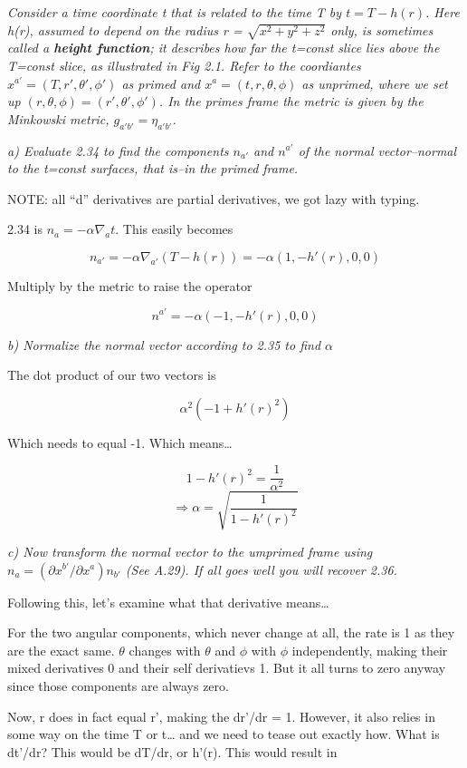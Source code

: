 \documentclass[landscape,letterpaper,10pt,english]{article}
\begin{document}
\[\label{P3}\]

\emph{Consider a time coordinate t that is related to the time T by
\(t = T-h(r)\). Here h(r), assumed to depend on the radius r =
\(\sqrt{x^2+y^2+z^2}\) only, is sometimes called a \textbf{height
function}; it describes how far the t=const slice lies above the T=const
slice, as illustrated in Fig 2.1. Refer to the coordiantes
\(x^{a'}=(T,r',\theta',\phi')\) as primed and
\(x^{a}=(t,r,\theta,\phi)\) as unprimed, where we set up
\((r,\theta,\phi)=(r',\theta ', \phi ')\). In the primes frame the
metric is given by the Minkowski metric, \(g_{a'b'} = \eta_{a'b'}\).}

\emph{a) Evaluate 2.34 to find the components \(n_{a'}\) and \(n^{a'}\)
of the normal vector--normal to the t=const surfaces, that is--in the
primed frame.}

    NOTE: all ``d'' derivatives are partial derivatives, we got lazy with
typing.

2.34 is \(n_a = -\alpha \nabla_a t\). This easily becomes

\[ n_{a'} = -\alpha \nabla_{a'} (T-h(r)) = -\alpha(1,-h'(r),0,0)\]

Multiply by the metric to raise the operator

\[ n^{a'} = -\alpha(-1,-h'(r),0,0)\]

    \emph{b) Normalize the normal vector according to 2.35 to find
\(\alpha\)}

The dot product of our two vectors is

\[ \alpha^2 (-1 + h'(r)^2) \]

Which needs to equal -1. Which means\ldots{}

\[ 1-h'(r)^2 = \frac{1}{\alpha^2} \]
\[ \Rightarrow \alpha = \sqrt{\frac{1}{1-h'(r)^2}} \]

    \emph{c) Now transform the normal vector to the umprimed frame using
\(n_a = (\partial x^{b'} / \partial x^a)n_{b'}\) (See A.29). If all goes
well you will recover 2.36.}

    Following this, let's examine what that derivative means\ldots{}

For the two angular components, which never change at all, the rate is 1
as they are the exact same. \(\theta\) changes with \(\theta\) and
\(\phi\) with \(\phi\) independently, making their mixed derivatives 0
and their self derivatievs 1. But it all turns to zero anyway since
those components are always zero.

Now, r does in fact equal r', making the dr'/dr = 1. However, it also
relies in some way on the time T or t\ldots{} and we need to tease out
exactly how. What is dt'/dr? This would be dT/dr, or h'(r). This would
result in
\end{document}
